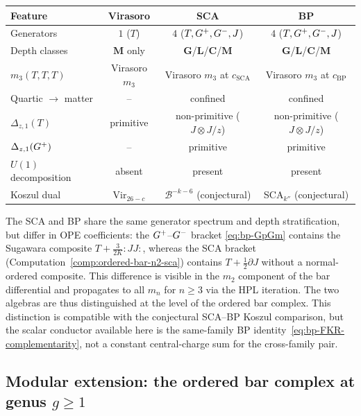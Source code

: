 \begin{computation}[The ordered bar complex of the
Bershadsky--Polyakov algebra
$\mathcal{B}^{k'} = W_{k'}(\mathfrak{sl}_3,f_{\min})$;
\ClaimStatusProvedHere]
\begin{center}
\renewcommand{\arraystretch}{1.15}
\begin{tabular}{lccc}
\textbf{Feature} & \textbf{Virasoro}
& \textbf{SCA} & \textbf{BP} \\
\hline
Generators & $1$ ($T$) & $4$ ($T,G^+,G^-,J$)
& $4$ ($T,G^+,G^-,J$) \\
Depth classes & $\mathbf{M}$ only
& $\mathbf{G}$/$\mathbf{L}$/$\mathbf{C}$/$\mathbf{M}$
& $\mathbf{G}$/$\mathbf{L}$/$\mathbf{C}$/$\mathbf{M}$ \\
$m_3(T,T,T)$ & Virasoro $m_3$
& Virasoro $m_3$ at $c_{\mathrm{SCA}}$
& Virasoro $m_3$ at $c_{\mathrm{BP}}$ \\
Quartic $\to$ matter & --
& confined & confined \\
$\Delta_{z,1}(T)$ & primitive
& non-primitive ($J\otimes J/z$)
& non-primitive ($J\otimes J/z$) \\
$\Delta_{z,1}(G^+)$ & --
& primitive & primitive \\
$U(1)$ decomposition & absent
& present & present \\
Koszul dual & $\mathrm{Vir}_{26-c}$
& $\mathcal{B}^{-k-6}$ (conjectural)
& SCA${}_{k''}$ (conjectural)
\end{tabular}
\end{center}
The SCA and BP share the same generator spectrum and depth
stratification, but differ in OPE coefficients: the
$G^+$--$G^-$ bracket \eqref{eq:bp-GpGm} contains the
Sugawara composite $T+\frac{3}{2K}{:}JJ{:}$, whereas the
SCA bracket (Computation~\ref{comp:ordered-bar-n2-sca})
contains $T+\frac{1}{2}\partial J$ without a normal-ordered
composite. This difference is visible in the $m_2$ component
of the bar differential and propagates to all $m_n$ for
$n\ge 3$ via the HPL iteration. The two algebras are
thus distinguished at the level of the ordered bar complex. This
distinction is compatible with the conjectural SCA--BP Koszul
comparison, but the scalar conductor available here is the
same-family BP identity~\eqref{eq:bp-FKR-complementarity}, not a
constant central-charge sum for the cross-family pair.
\end{computation}

\subsection{Modular extension: the ordered bar complex at
genus $g\ge 1$}
\label{subsec:ordered-bar-modular}

